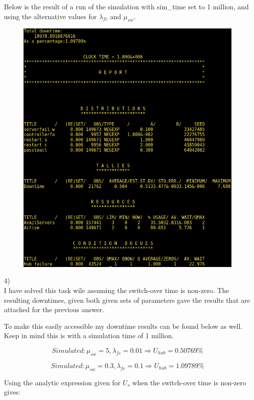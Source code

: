 \documentclass[11pt]{article}
\begin{document}
Below is the result of a run of the simulation with sim\_time set to 1 million, and using the alternative values for $\lambda_{fc}$ and $\mu_{sw}$.

\begin{figure}[H]
	\includegraphics[width=\textwidth]{demos_2-2_alt.png}
	\centering
\end{figure}

4)\\ I have solved this task wile assuming the switch-over time is non-zero. The resulting downtimes, given both given sets of parameters gave the results that are attached for the previous answer.

To make this easily accessible my downtime results can be found below as well. Keep in mind this is with a simulation time of 1 million.

$$Simulated: \mu_{sw} = 5, \lambda_{fc} = 0.01 \Rightarrow U_{hub} = 0.50769\%$$

$$Simulated: \mu_{sw} = 0.3, \lambda_{fc} = 0.1 \Rightarrow U_{hub} = 1.09789\%$$

Using the analytic expression given for $U_s$ when the switch-over time is non-zero gives:
\end{document}
